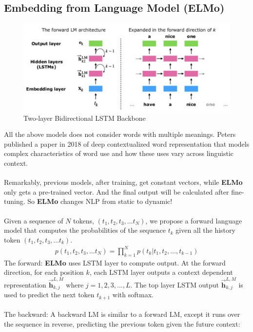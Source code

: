 \documentclass[paper=a4, fontsize=12pt]{scrartcl}
\begin{document}
\subsection{Embedding from Language Model (ELMo)}
 \begin{figure}
  \includegraphics[scale=0.7]{ELMo.png}
  \caption{Two-layer Bidirectional LSTM Backbone}
  \label{fig:skip-gram}
\end{figure}
All the above models does not consider words with multiple meanings. Peters published a paper in 2018 of deep contextualized word representation that models complex characteristics of word use and how these uses vary across linguistic context. \\\\
Remarkably, previous models, after training, get constant vectors, while \textbf{ELMo} only gets a pre-trained vector. And the final output will be calculated after fine-tuning. So \textbf{ELMo} changes NLP from static to dynamic! \\\\
Given a sequence of $N$ tokens, $(t_1, t_2, t_3, ... t_N)$, we propose a forward language model that computes the probabilities of the sequence $t_k$ given all the history token $(t_1, t_2, t_3, ... t_k)$. 
\begin{align*}
p(t_1, t_2, t_3, ... t_N) = \prod^N_{k = 1} p(t_k | t_1, t_2, ... ,t_{k-1})
\end{align*}
The forward: \textbf{ELMo} uses LSTM layer to compute output. At the forward direction, for each position $k$, each LSTM layer outputs a context dependent representation $\vec{\mathbf{h}}^{L,M}_{k, j}$ where $j = 1, 2, 3, ..., L$. The top layer LSTM output $\vec{\mathbf{h}}^{L,M}_{k, j}$ is used to predict the next token $t_{k+1}$ with softmax. \\\\
The backward:  A backward LM is similar to a forward LM, except it runs over the sequence in reverse, predicting the previous token given the future context:
\end{document}
